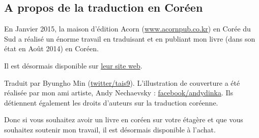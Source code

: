 



\subsection*{A propos de la traduction en Coréen}

En Janvier 2015, la maison d'édition Acorn (\href{http://www.acornpub.co.kr}{www.acornpub.co.kr}) en Corée du Sud a réalisé un énorme travail en traduisant et en publiant mon livre (dans son état en Août 2014) en Coréen.

Il est désormais disponible sur \href{http://go.yurichev.com/17343}{leur site web}.

\iffalse
\begin{figure}[H]
\centering
\texttt{[image: acorn\_cover.jpg]}
\end{figure}
\fi

Traduit par Byungho Min (\href{http://go.yurichev.com/17344}{twitter/tais9}).
L'illustration de couverture a été réalisée par mon ami artiste, Andy Nechaevsky :
\href{http://go.yurichev.com/17023}{facebook/andydinka}.
Ils détiennent également les droits d'auteurs sur la traduction coréenne.

Donc si vous souhaitez avoir un livre  en coréen sur votre étagère et que vous souhaitez soutenir mon travail, il est désormais disponible à l'achat.


